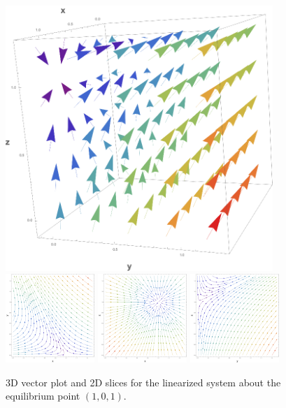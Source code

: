 \documentclass[10pt]{article}
\newcommand{\np}{\vfill\newpage}
\begin{document}
\begin{figure}[h!]
\centering
\includegraphics[width=0.9\textwidth]{fourtheqpoint3d.png} \\
\includegraphics[width=0.3\textwidth]{fourtheqpointxy.png}
\includegraphics[width=0.3\textwidth]{fourtheqpointxz.png}
\includegraphics[width=0.3\textwidth]{fourtheqpointyz.png}
\caption{3D vector plot and 2D slices for the linearized system about the equilibrium point \( (1,0,1) \).}
\label{fig:fourtheqpoint}
\end{figure}
\np
\end{document}

